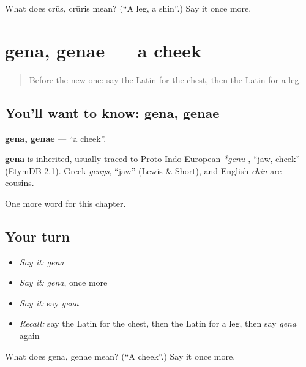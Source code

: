 \begin{tcolorbox}[breakable,colback=teal!4,colframe=teal!35!black,title={Before you move on}]
What does crūs, crūris mean? (\textquotedblleft{}A leg, a shin\textquotedblright{}.) Say it once more.
\end{tcolorbox}
\section[gena, genae]{gena, genae — a cheek}

\label{lesson:LA-C66-gena}



\begin{quote}
Before the new one: say the Latin for the chest, then the Latin for a leg.
\end{quote}

\subsection*{You'll want to know: gena, genae}
\textbf{gena, genae} — \textquotedblleft{}a cheek\textquotedblright{}.

\begin{cousinweb}
\textbf{gena} is inherited, usually traced to Proto-Indo-European \emph{*genu-}, \textquotedblleft{}jaw, cheek\textquotedblright{} (EtymDB 2.1). Greek \emph{genys}, \textquotedblleft{}jaw\textquotedblright{} (Lewis \& Short), and English \emph{chin} are cousins.
\end{cousinweb}

\begin{grammarlens}[title={What you've built}]
One more word for this chapter.
\end{grammarlens}

\subsection*{Your turn}
\begin{itemize}
\raggedright
  \item \emph{Say it:} \emph{gena}
  \item \emph{Say it:} \emph{gena}, once more
  \item \emph{Say it:} say \emph{gena}
  \item \emph{Recall:} say the Latin for the chest, then the Latin for a leg, then say \emph{gena} again
\end{itemize}

\begin{tcolorbox}[breakable,colback=teal!4,colframe=teal!35!black,title={Before you move on}]
What does gena, genae mean? (\textquotedblleft{}A cheek\textquotedblright{}.) Say it once more.
\end{tcolorbox}
